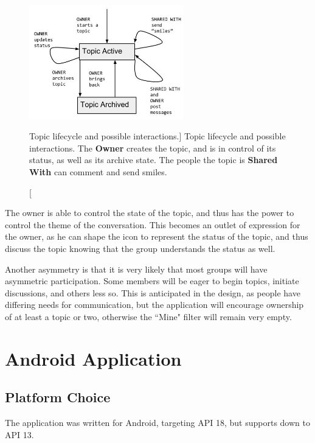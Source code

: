         \begin{figure}
        \centering
        \includegraphics[width=0.6\textwidth]{topic_lifecycle.jpg}
        \caption
        [Topic lifecycle and possible interactions.]
        {Topic lifecycle and possible interactions.
        The \textbf{Owner} creates the topic, and is in control of its status,
        as well as its archive state.
        The people the topic is \textbf{Shared With} can comment and send smiles.}
        \label{fig:topic_lifecycle}
        \end{figure}

      The owner is able to control the state of the topic,
      and thus has the power to control the theme of the conversation.
      This becomes an outlet of expression for the owner,
      as he can shape the icon to represent the status of the topic,
      and thus discuss the topic knowing that the group understands the status as well.

      Another asymmetry is that it is very likely that most groups will
      have asymmetric participation.
      Some members will be eager to begin topics, initiate discussions,
      and others less so.
      This is anticipated in the design,
      as people have differing needs for communication,
      but the application will encourage ownership of at least a topic or two,
      otherwise the ``Mine" filter will remain very empty.

  \section{Android Application}

    \subsection{Platform Choice}
    The application was written for Android, targeting API 18,
    but supports down to API 13.

